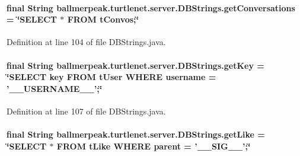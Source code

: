 \hypertarget{classballmerpeak_1_1turtlenet_1_1server_1_1DBStrings_a329ba6510f891c7ff5a45117bb13c46f}{
\paragraph[{get\-Conversations}]{\setlength{\rightskip}{0pt plus 5cm}final String ballmerpeak.\-turtlenet.\-server.\-D\-B\-Strings.\-get\-Conversations = \char`\"{}S\-E\-L\-E\-C\-T $\ast$ F\-R\-O\-M t\-Convos;\char`\"{}\hspace{0.3cm}{\ttfamily [static]}}}\label{classballmerpeak_1_1turtlenet_1_1server_1_1DBStrings_a329ba6510f891c7ff5a45117bb13c46f}


Definition at line 104 of file D\-B\-Strings.\-java.

\hypertarget{classballmerpeak_1_1turtlenet_1_1server_1_1DBStrings_ad9a4d662e135722a93cd5b5b37839e84}{
\paragraph[{get\-Key}]{\setlength{\rightskip}{0pt plus 5cm}final String ballmerpeak.\-turtlenet.\-server.\-D\-B\-Strings.\-get\-Key = \char`\"{}S\-E\-L\-E\-C\-T key F\-R\-O\-M t\-User W\-H\-E\-R\-E username = '\-\_\-\-\_\-\-U\-S\-E\-R\-N\-A\-M\-E\-\_\-\-\_\-';\char`\"{}\hspace{0.3cm}{\ttfamily [static]}}}\label{classballmerpeak_1_1turtlenet_1_1server_1_1DBStrings_ad9a4d662e135722a93cd5b5b37839e84}


Definition at line 107 of file D\-B\-Strings.\-java.

\hypertarget{classballmerpeak_1_1turtlenet_1_1server_1_1DBStrings_ae351265e633b120e4897cf92f17d3018}{
\paragraph[{get\-Like}]{\setlength{\rightskip}{0pt plus 5cm}final String ballmerpeak.\-turtlenet.\-server.\-D\-B\-Strings.\-get\-Like = \char`\"{}S\-E\-L\-E\-C\-T $\ast$ F\-R\-O\-M t\-Like W\-H\-E\-R\-E parent = '\-\_\-\-\_\-\-S\-I\-G\-\_\-\-\_\-';\char`\"{}\hspace{0.3cm}{\ttfamily [static]}}}\label{classballmerpeak_1_1turtlenet_1_1server_1_1DBStrings_ae351265e633b120e4897cf92f17d3018}


